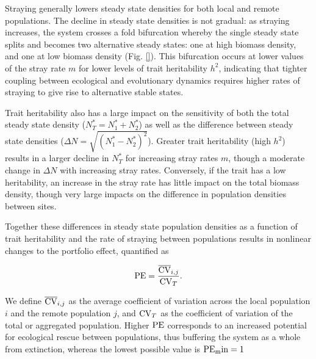 \documentclass[onecolumn,preprintnumbers,amsmath,amssymb,superscriptaddress]{revtex4}
\begin{document}
Straying generally lowers steady state densities for both local and remote populations. %
The decline in steady state densities is not gradual: as straying increases, the system crosses a fold bifurcation whereby the single steady state splits and becomes two alternative steady states: one at high biomass density, and one at low biomass density (Fig. \ref{}).
This bifurcation occurs at lower values of the stray rate $m$ for lower levels of trait heritability $h^2$, indicating that tighter coupling between ecological and evolutionary dynamics  requires higher rates of straying to give rise to alternative stable states.

Trait heritability also has a large impact on the sensitivity of both the total steady state density ($N^*_T=N^*_1+N^*_2$) as well as the difference between steady state densities ($\Delta N=\sqrt{(N^*_1-N^*_2)^2}$).
Greater trait heritability (high $h^2$) results in a larger decline in $N_T^*$ for increasing stray rates $m$, though a moderate change in $\Delta N$ with increasing stray rates.
Conversely, if the trait has a low heritability, an increase in the stray rate has little impact on the total biomass density, though very large impacts on the difference in population densities between sites. 

Together these differences in steady state population densities as a function of trait heritability and the rate of straying between populations results in nonlinear changes to the portfolio effect, quantified as

\begin{equation}
  {\rm PE} = \frac{\overline{{\rm CV}}_{i,j}}{{\rm CV}_T}.
  \label{eq:pe}
\end{equation}

\noindent We define $\overline{{\rm CV}}_{i,j}$ as the average coefficient of variation across the local population $i$ and the remote population $j$, and ${\rm CV}_T$ as the coefficient of variation of the total or aggregated population.
Higher ${\rm PE}$ corresponds to an increased potential for ecological rescue between populations, thus buffering the system as a whole from extinction, whereas the lowest possible value is ${\rm PE_min}=1$
\end{document}

